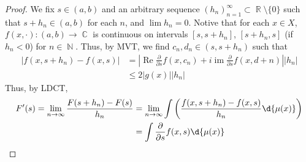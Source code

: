 \documentclass[11pt, a4paper]{memoir}
\DeclareMathOperator{\N}{{\mathbb{N}}}
\DeclareMathOperator{\R}{{\mathbb{R}}}
\DeclareMathOperator{\C}{{\mathbb{C}}}
\theoremstyle{change}
\theoremstyle{plain}
\theoremstyle{nonumberplain}
\newtheorem{proof}{Proof}
\DeclareMathOperator{\im}{im}
\renewcommand{\Re}{\ensuremath{\operatorname{Re}}}
\begin{document}
\begin{proof}
    We fix $s\in(a,b)$ and an arbitrary sequence $(h_n)_{n=1}^\infty\subset\R\setminus\{0\}$ such that $s+h_n\in(a,b)$ for each $n$, and $\lim h_n=0$.
    Notive that for each $x\in X$, $f(x,\cdot):(a,b)\to\C$ is continuous on intervals $[s,s+h_n]$, $[s+h_n,s]$ (if $h_n<0$) for $n\in\N$.
    Thus, by MVT, we find $c_n,d_n\in(s,s+h_n)$ such that
    \begin{align*}
        |f(x,s+h_n)-f(x,s)| &= \left\lvert\Re\frac{\partial}{\partial s}f(x,c_n)+i\im\frac{\partial}{\partial s}f(x,d+n)\right\rvert|h_n|\\
                            &\leq 2|g(x)||h_n|
    \end{align*}
    Thus, by LDCT,
    \begin{align*}
        F'(s)=\lim_{n\to\infty}\frac{F(s+h_n)-F(s)}{h_n}&=\lim_{n\to\infty}\int\left(\frac{f(x,s+h_n)-f(x,s)}{h_n}\d{\mu(x)}\right)\\
                                                        &= \int\frac{\partial}{\partial s}f(x,s)\d{\mu(x)}
    \end{align*}
\end{proof}
\end{document}
